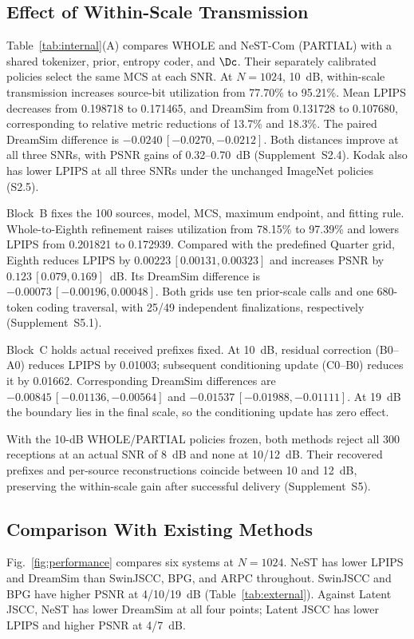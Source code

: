 \ifCLASSOPTIONonecolumn\else\fi
\subsection{Effect of Within-Scale Transmission}

Table~\ref{tab:internal}(A) compares WHOLE and NeST-Com (PARTIAL) with a shared tokenizer, prior, entropy coder, and $\Dc$. Their separately calibrated policies select the same MCS at each SNR. At $N=1024$, 10~dB, within-scale transmission increases source-bit utilization from 77.70\% to 95.21\%. Mean LPIPS decreases from 0.198718 to 0.171465, and DreamSim from 0.131728 to 0.107680, corresponding to relative metric reductions of 13.7\% and 18.3\%. The paired DreamSim difference is $-0.0240\,[-0.0270,-0.0212]$. Both distances improve at all three SNRs, with PSNR gains of 0.32--0.70~dB (Supplement~S2.4). Kodak also has lower LPIPS at all three SNRs under the unchanged ImageNet policies (S2.5).

Block~B fixes the 100 sources, model, MCS, maximum endpoint, and fitting rule. Whole-to-Eighth refinement raises utilization from 78.15\% to 97.39\% and lowers LPIPS from 0.201821 to 0.172939. Compared with the predefined Quarter grid, Eighth reduces LPIPS by $0.00223\,[0.00131,0.00323]$ and increases PSNR by $0.123\,[0.079,0.169]$~dB. Its DreamSim difference is $-0.00073\,[-0.00196,0.00048]$. Both grids use ten prior-scale calls and one 680-token coding traversal, with 25/49 independent finalizations, respectively (Supplement~S5.1).

Block~C holds actual received prefixes fixed. At 10~dB, residual correction (B0--A0) reduces LPIPS by 0.01003; subsequent conditioning update (C0--B0) reduces it by 0.01662. Corresponding DreamSim differences are $-0.00845\,[-0.01136,-0.00564]$ and $-0.01537\,[-0.01988,-0.01111]$. At 19~dB the boundary lies in the final scale, so the conditioning update has zero effect.

With the 10-dB WHOLE/PARTIAL policies frozen, both methods reject all 300 receptions at an actual SNR of 8~dB and none at 10/12~dB. Their recovered prefixes and per-source reconstructions coincide between 10 and 12~dB, preserving the within-scale gain after successful delivery (Supplement~S5).

\subsection{Comparison With Existing Methods}
\ifCLASSOPTIONonecolumn\fi

Fig.~\ref{fig:performance} compares six systems at $N=1024$. NeST has lower LPIPS and DreamSim than SwinJSCC, BPG, and ARPC throughout. SwinJSCC and BPG have higher PSNR at 4/10/19~dB (Table~\ref{tab:external}). Against Latent JSCC, NeST has lower DreamSim at all four points; Latent JSCC has lower LPIPS and higher PSNR at 4/7~dB.

